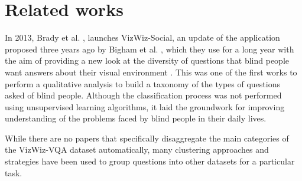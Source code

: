 \section{Related works}




In 2013, Brady et al. \cite{vizwiz_taxonomy}, launches VizWiz-Social, an update of the application proposed three years ago by Bigham et al. \cite{vizwiz_phone}, which they use for a long year with the aim of providing a new look at the diversity of questions that blind people want answers about their visual environment .
This was one of the first works to perform a qualitative analysis to build a taxonomy of the types of questions asked of blind people. Although the classification process was not performed using unsupervised learning algorithms, it laid the groundwork for improving understanding of the problems faced by blind people in their daily lives.

While there are no papers that specifically disaggregate the main categories of the VizWiz-VQA dataset automatically, many clustering approaches and strategies have been used to group questions into other datasets for a particular task.


